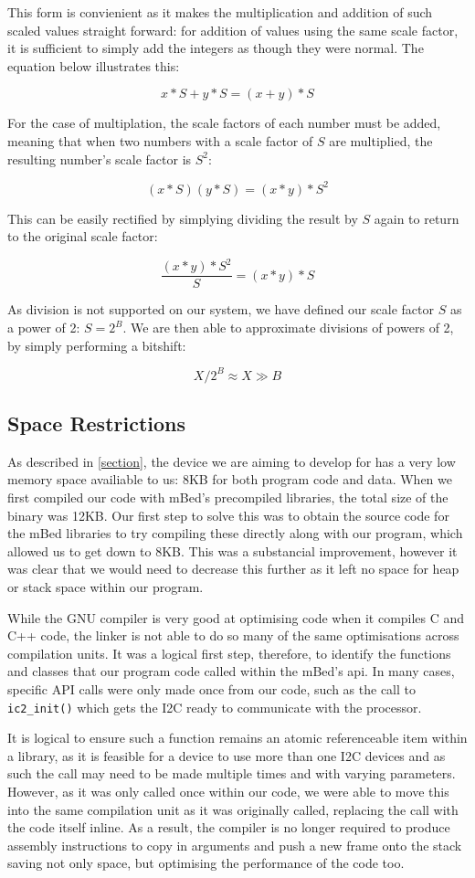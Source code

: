 This form is convienient as it makes the multiplication and addition of such scaled values straight forward: for addition of values using the same scale factor, it is sufficient to simply add the integers as though they were normal. The equation below illustrates this:

$$x*S+y*S=(x+y)*S$$

For the case of multiplation, the scale factors of each number must be added, meaning that when two numbers with a scale factor of $S$ are multiplied, the resulting number's scale factor is $S^2$:

$$(x*S)(y*S)=(x*y)*S^2$$

This can be easily rectified by simplying dividing the result by $S$ again to return to the original scale factor:

$$\frac{(x*y)*S^2}{S}=(x*y)*S$$

As division is not supported on our system, we have defined our scale factor $S$ as a power of 2: $S=2^B$. We are then able to approximate divisions of powers of 2, by simply performing a bitshift:

$$X/2^B\approx X \gg B$$

\subsection{Space Restrictions}

As described in \ref{section}, the device we are aiming to develop for has a very low memory space availiable to us: 8KB for both program code and data. When we first compiled our code with mBed's precompiled libraries, the total size of the binary was 12KB. Our first step to solve this was to obtain the source code for the mBed libraries to try compiling these directly along with our program, which allowed us to get down to 8KB. This was a substancial improvement, however it was clear that we would need to decrease this further as it left no space for heap or stack space within our program.

While the GNU compiler is very good at optimising code when it compiles C and C++ code, the linker is not able to do so many of the same optimisations across compilation units. It was a logical first step, therefore, to identify the functions and classes that our program code called within the mBed's api. In many cases, specific API calls were only made once from our code, such as the call to \verb|ic2_init()| which gets the I2C ready to communicate with the processor.

It is logical to ensure such a function remains an atomic referenceable item within a library, as it is feasible for a device to use more than one I2C devices and as such the call may need to be made multiple times and with varying parameters. However, as it was only called once within our code, we were able to move this into the same compilation unit as it was originally called, replacing the call with the code itself inline. As a result, the compiler is no longer required to produce assembly instructions to copy in arguments and push a new frame onto the stack saving not only space, but optimising the performance of the code too.

